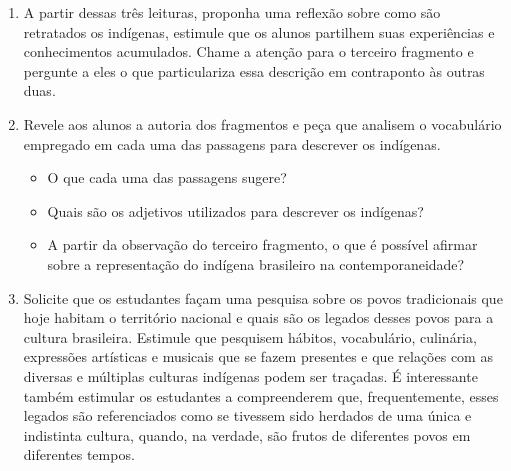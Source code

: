 \documentclass[12pt]{extarticle}
\begin{document}
\begin{enumerate}
\begin{quote}
\begin{enumerate}
\setcounter{enumii}{3}
\item A feição deles é serem pardos, maneira de avermelhados, de bons
rostos e bons narizes, bem"-feitos. Andam nus, sem nenhuma cobertura.
Nem estimam de cobrir ou de mostrar suas vergonhas; e nisso têm
tanta inocência como em mostrar o rosto. Ambos traziam os beiços de
baixo furados e metidos neles seus ossos brancos e verdadeiros, de
comprimento duma mão travessa, da grossura dum fuso de algodão,
agudos na ponta como um furador. Metem"-nos pela parte de dentro do
beiço; e a parte que lhes fica entre o beiço e os dentes é feita
como roque de xadrez, ali encaixado de tal sorte que não os molesta,
nem os estorva no falar, no comer ou no beber {[\ldots{}]}\footnote{\textsc{caminha}, Pero Vaz. \emph{A carta}. Disponível em:
\href{http://www.dominiopublico.gov.br/pesquisa/DetalheObraForm.do?select_action=\&co_obra=17424}{dominiopublico.gov.br}.}
\end{enumerate}
\end{quote}

\item A partir dessas três leituras, proponha uma reflexão sobre como são
retratados os indígenas, estimule que os alunos partilhem suas
experiências e conhecimentos acumulados. Chame a atenção para o
terceiro fragmento e pergunte a eles o que particulariza essa
descrição em contraponto às outras duas.

\item Revele aos alunos a autoria dos fragmentos e peça que analisem o
vocabulário empregado em cada uma das passagens para descrever os
indígenas.

\begin{itemize}
\item
  O que cada uma das passagens sugere?
\item
  Quais são os adjetivos utilizados para descrever os indígenas?
\item
  A partir da observação do terceiro fragmento, o que é possível afirmar
  sobre a representação do indígena brasileiro na contemporaneidade?
\end{itemize}

\item Solicite que os estudantes façam uma pesquisa sobre os povos
tradicionais que hoje habitam o território nacional e quais são os
legados desses povos para a cultura brasileira. Estimule que
pesquisem hábitos, vocabulário, culinária, expressões artísticas e
musicais que se fazem presentes e que relações com as diversas e
múltiplas culturas indígenas podem ser traçadas. É interessante
também estimular os estudantes a compreenderem que, frequentemente,
esses legados são referenciados como se tivessem sido herdados de
uma única e indistinta cultura, quando, na verdade, são frutos de
diferentes povos em diferentes tempos.

\end{enumerate}
\end{document}
